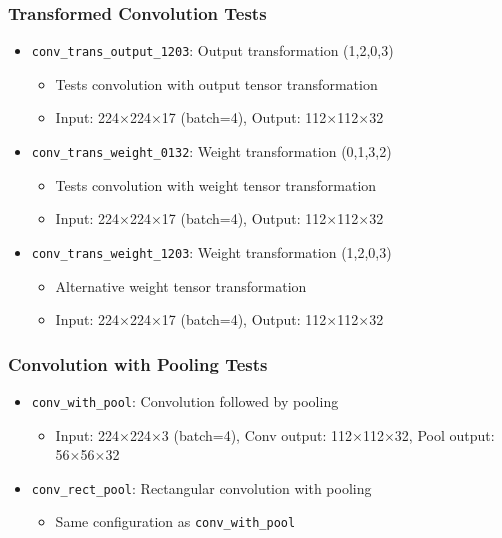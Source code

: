 \subsubsection{Transformed Convolution Tests}
\begin{itemize}
\item \texttt{conv\_trans\_output\_1203}: Output transformation (1,2,0,3)
  \begin{itemize}
  \item Tests convolution with output tensor transformation
  \item Input: 224$\times$224$\times$17 (batch=4), Output: 112$\times$112$\times$32
  \end{itemize}

\item \texttt{conv\_trans\_weight\_0132}: Weight transformation (0,1,3,2)
  \begin{itemize}
  \item Tests convolution with weight tensor transformation
  \item Input: 224$\times$224$\times$17 (batch=4), Output: 112$\times$112$\times$32
  \end{itemize}

\item \texttt{conv\_trans\_weight\_1203}: Weight transformation (1,2,0,3)
  \begin{itemize}
  \item Alternative weight tensor transformation
  \item Input: 224$\times$224$\times$17 (batch=4), Output: 112$\times$112$\times$32
  \end{itemize}
\end{itemize}

\subsubsection{Convolution with Pooling Tests}
\begin{itemize}
\item \texttt{conv\_with\_pool}: Convolution followed by pooling
  \begin{itemize}
  \item Input: 224$\times$224$\times$3 (batch=4), Conv output: 112$\times$112$\times$32, Pool output: 56$\times$56$\times$32
  \end{itemize}

\item \texttt{conv\_rect\_pool}: Rectangular convolution with pooling
  \begin{itemize}
  \item Same configuration as \texttt{conv\_with\_pool}
  \end{itemize}
\end{itemize}

